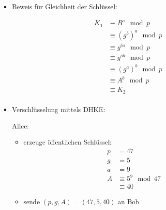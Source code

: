 \documentclass[
  a4paper,
  11pt,
]{article}
\begin{document}
\begin{itemize}
  \item Beweis für Gleichheit der Schlüssel:

    \begin{align*}
      K_1 & \equiv B^a \mod p\\
      & \equiv (g^b)^a \mod p\\
      & \equiv g^{ba} \mod p\\
      & \equiv g^{ab} \mod p\\
      & \equiv (g^a)^b \mod p\\
      & \equiv A^b \mod p\\
      & \equiv K_2\\
    \end{align*}

  \item Verschlüsselung mittels DHKE:

    Alice:
    \begin{itemize}
      \item erzeuge öffentlichen Schlüssel:
        \begin{align*}
          p & = 47\\
          g & = 5\\
          a & = 9\\
          A & \equiv  5^9 \mod 47\\
            & \equiv 40
        \end{align*}
      \item sende $(p, g, A) = (47, 5, 40)$ an Bob
    \end{itemize}


\end{itemize}
\end{document}

